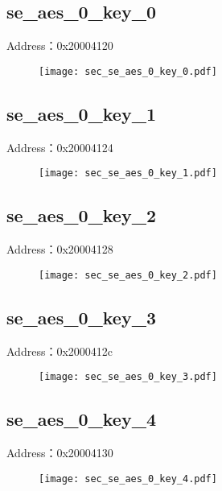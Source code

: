 \subsection{se\_aes\_0\_key\_0}
\label{sec-se-aes-0-key-0}
Address：0x20004120
 \begin{figure}[H]
\texttt{[image: sec\_se\_aes\_0\_key\_0.pdf]}
\end{figure}

\subsection{se\_aes\_0\_key\_1}
\label{sec-se-aes-0-key-1}
Address：0x20004124
 \begin{figure}[H]
\texttt{[image: sec\_se\_aes\_0\_key\_1.pdf]}
\end{figure}

\subsection{se\_aes\_0\_key\_2}
\label{sec-se-aes-0-key-2}
Address：0x20004128
 \begin{figure}[H]
\texttt{[image: sec\_se\_aes\_0\_key\_2.pdf]}
\end{figure}

\subsection{se\_aes\_0\_key\_3}
\label{sec-se-aes-0-key-3}
Address：0x2000412c
 \begin{figure}[H]
\texttt{[image: sec\_se\_aes\_0\_key\_3.pdf]}
\end{figure}

\subsection{se\_aes\_0\_key\_4}
\label{sec-se-aes-0-key-4}
Address：0x20004130
 \begin{figure}[H]
\texttt{[image: sec\_se\_aes\_0\_key\_4.pdf]}
\end{figure}

